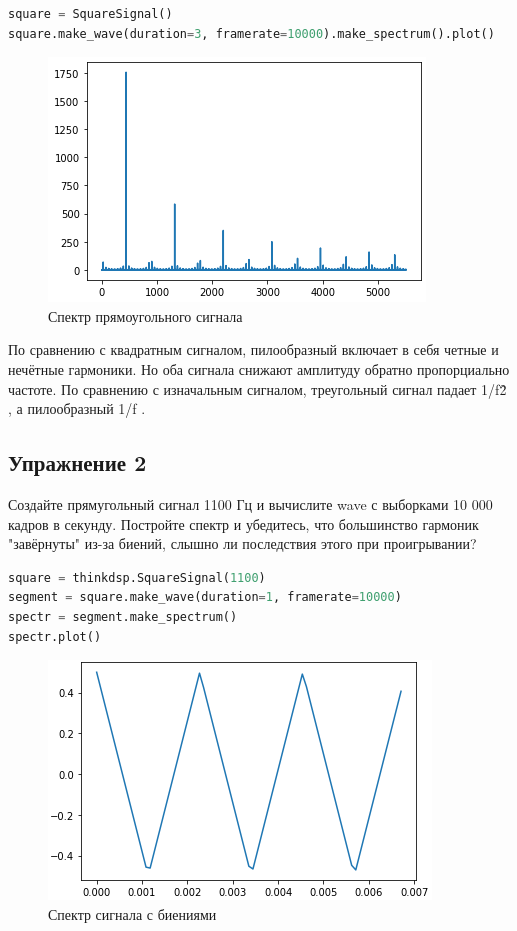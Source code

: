 \begin{lstlisting}[language=Python]
square = SquareSignal()
square.make_wave(duration=3, framerate=10000).make_spectrum().plot()
\end{lstlisting}

\begin{figure}[H]
	\begin{center}
		\includegraphics[scale=1]{fig/lab02/lab2_4.png}
		\caption{Спектр прямоугольного сигнала}
	\end{center}
\end{figure}

По сравнению с квадратным сигналом, пилообразный включает в себя четные и нечётные гармоники. Но оба сигнала снижают амплитуду обратно пропорциально частоте. По сравнению с изначальным сигналом, треугольный сигнал падает  1/f\^2 , а пилообразный  1/f .

\subsection{Упражнение 2}

Создайте прямугольный сигнал 1100 Гц и вычислите wave с выборками 10 000 кадров в секунду. Постройте спектр и убедитесь, что большинство гармоник "завёрнуты" из-за биений, слышно ли последствия этого при проигрывании?

\begin{lstlisting}[language=Python]
square = thinkdsp.SquareSignal(1100)
segment = square.make_wave(duration=1, framerate=10000)
spectr = segment.make_spectrum()
spectr.plot()
\end{lstlisting}

\begin{figure}[H]
	\begin{center}
		\includegraphics[scale=1]{fig/lab02/lab2_5.png}
		\caption{Спектр сигнала с биениями}
	\end{center}
\end{figure}

